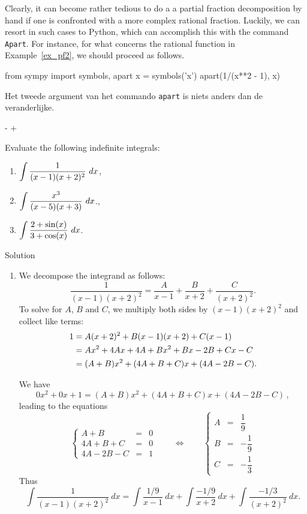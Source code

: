 \fi
\ifpython
Clearly, it can become rather tedious to do a a partial fraction decomposition by hand if one is confronted with a more complex rational fraction. Luckily, we can resort in such cases to Python, which can accomplish this with the command \lstinline{Apart}. For instance, for what concerns the rational function in Example~\eqref{ex_pf2}, we should proceed as follows. 
\begin{pyin}
from sympy import symbols, apart
x = symbols('x')
apart(1/(x**2 - 1), x)
\end{pyin}
Het tweede argument van het commando \lstinline{apart} is niets anders dan de veranderlijke. 
\begin{pyout}
- + 
\end{pyout}
\fi
\begin{example}
Evaluate the following indefinite integrals:
\begin{multicols}{2}
\begin{enumerate}
\item  $\ds\int\frac{1}{(x-1)(x+2)^2}\ dx$,
\item  $\ds \int \frac{x^3}{(x-5)(x+3)}\ dx$\ifcalculus .\fi\ifanalysis,\fi
\ifanalysis \item $\ds \int \frac{2+\sin(x)}{3+\cos(x)}\ dx$. \fi
\end{enumerate}
\end{multicols}

\ifcalculus\pagebreak\fi
{}Solution 

\begin{enumerate}
\item  We decompose the integrand as follows:
$$\frac{1}{(x-1)(x+2)^2} = \frac{A}{x-1} + \frac{B}{x+2} + \frac{C}{(x+2)^2}.$$
To solve for $A$, $B$ and $C$, we multiply both sides by $(x-1)(x+2)^2$ and collect like terms:
\begin{align}
1 &= A(x+2)^2 + B(x-1)(x+2) + C(x-1)\label{eq:pf3}\\
	&= Ax^2+4Ax+4A + Bx^2 + Bx-2B + Cx-C \notag \\
	&= (A+B)x^2 + (4A+B+C)x + (4A-2B-C).\notag
\end{align}

We have $$0x^2+0x+ 1 = (A+B)x^2 + (4A+B+C)x + (4A-2B-C)\,,$$
leading to the equations 
$$
\left\{\begin{array}{rcl}
A+B &=& 0\\
4A+B+C &=& 0\\
4A-2B-C &=& 1
\end{array}
\right.\qquad\Leftrightarrow\qquad
\left\{\begin{array}{rcl}
A &=& \dfrac{1}{9}\\[0.2cm]
B&=& -\dfrac{1}{9}\\[0.2cm]
C &=& -\dfrac{1}{3}
\end{array}
\right.
$$
Thus 
$$\int\frac{1}{(x-1)(x+2)^2}\ dx = \int \frac{1/9}{x-1}\ dx + \int \frac{-1/9}{x+2}\ dx + \int \frac{-1/3}{(x+2)^2}\ dx.$$


\end{enumerate}
\end{example}
